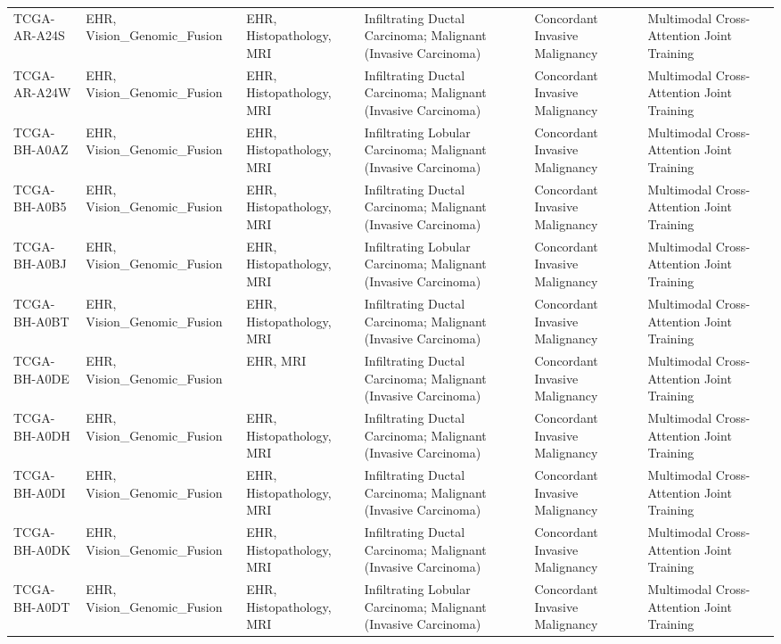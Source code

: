 \begin{table}
\begin{tabular}{llllll}
TCGA-AR-A24S & EHR, Vision\_Genomic\_Fusion & EHR, Histopathology, MRI & Infiltrating Ductal Carcinoma; Malignant (Invasive Carcinoma) & Concordant Invasive Malignancy & Multimodal Cross-Attention Joint Training \\
TCGA-AR-A24W & EHR, Vision\_Genomic\_Fusion & EHR, Histopathology, MRI & Infiltrating Ductal Carcinoma; Malignant (Invasive Carcinoma) & Concordant Invasive Malignancy & Multimodal Cross-Attention Joint Training \\
TCGA-BH-A0AZ & EHR, Vision\_Genomic\_Fusion & EHR, Histopathology, MRI & Infiltrating Lobular Carcinoma; Malignant (Invasive Carcinoma) & Concordant Invasive Malignancy & Multimodal Cross-Attention Joint Training \\
TCGA-BH-A0B5 & EHR, Vision\_Genomic\_Fusion & EHR, Histopathology, MRI & Infiltrating Ductal Carcinoma; Malignant (Invasive Carcinoma) & Concordant Invasive Malignancy & Multimodal Cross-Attention Joint Training \\
TCGA-BH-A0BJ & EHR, Vision\_Genomic\_Fusion & EHR, Histopathology, MRI & Infiltrating Lobular Carcinoma; Malignant (Invasive Carcinoma) & Concordant Invasive Malignancy & Multimodal Cross-Attention Joint Training \\
TCGA-BH-A0BT & EHR, Vision\_Genomic\_Fusion & EHR, Histopathology, MRI & Infiltrating Ductal Carcinoma; Malignant (Invasive Carcinoma) & Concordant Invasive Malignancy & Multimodal Cross-Attention Joint Training \\
TCGA-BH-A0DE & EHR, Vision\_Genomic\_Fusion & EHR, MRI & Infiltrating Ductal Carcinoma; Malignant (Invasive Carcinoma) & Concordant Invasive Malignancy & Multimodal Cross-Attention Joint Training \\
TCGA-BH-A0DH & EHR, Vision\_Genomic\_Fusion & EHR, Histopathology, MRI & Infiltrating Ductal Carcinoma; Malignant (Invasive Carcinoma) & Concordant Invasive Malignancy & Multimodal Cross-Attention Joint Training \\
TCGA-BH-A0DI & EHR, Vision\_Genomic\_Fusion & EHR, Histopathology, MRI & Infiltrating Ductal Carcinoma; Malignant (Invasive Carcinoma) & Concordant Invasive Malignancy & Multimodal Cross-Attention Joint Training \\
TCGA-BH-A0DK & EHR, Vision\_Genomic\_Fusion & EHR, Histopathology, MRI & Infiltrating Ductal Carcinoma; Malignant (Invasive Carcinoma) & Concordant Invasive Malignancy & Multimodal Cross-Attention Joint Training \\
TCGA-BH-A0DT & EHR, Vision\_Genomic\_Fusion & EHR, Histopathology, MRI & Infiltrating Lobular Carcinoma; Malignant (Invasive Carcinoma) & Concordant Invasive Malignancy & Multimodal Cross-Attention Joint Training \\

\end{tabular}
\end{table}
